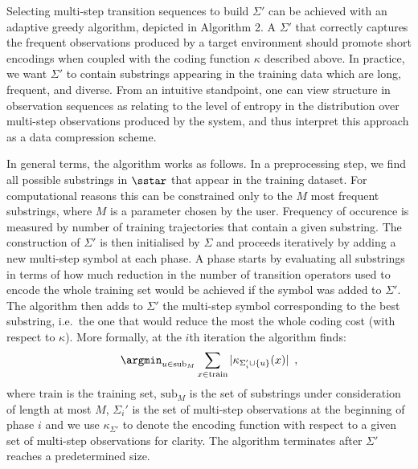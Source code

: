 Selecting multi-step transition sequences to build $\Sigma'$ can be achieved with an adaptive greedy algorithm, depicted in Algorithm 2. A $\Sigma'$ that correctly captures the frequent observations produced by a target environment should promote short encodings when coupled with the coding function $\kappa$ described above. In practice, we want $\Sigma'$ to contain substrings appearing in the training data which are long, frequent, and diverse. From an intuitive standpoint, one can view structure in observation sequences as relating to the level of entropy in the distribution over multi-step observations produced by the system, and thus interpret this approach as a data compression scheme. 

In general terms, the algorithm works as follows. In a preprocessing step, we find all possible substrings in $\sstar$ that appear in the training dataset. For computational reasons this can be constrained only to the $M$ most frequent substrings, where $M$ is a parameter chosen by the user. Frequency of occurence is measured by number of training trajectories that contain a given substring. The construction of $\Sigma'$ is then initialised by $\Sigma$ and proceeds iteratively by adding a new multi-step symbol at each phase. A phase starts by evaluating all substrings in terms of how much reduction in the number of transition operators used to encode the whole training set would be achieved if the symbol was added to $\Sigma'$. The algorithm then adds to $\Sigma'$ the multi-step symbol corresponding to the best substring, i.e.\ the one that would reduce the most the whole coding cost (with respect to $\kappa$). More formally, at the $i$th iteration the algorithm finds:
\begin{equation*}
\argmin_{u \in \mathrm{sub}_M} \sum_{x \in \mathrm{train}} |\kappa_{\Sigma_i' \cup \{u\}}(x)| \enspace,
\end{equation*}
where $\mathrm{train}$ is the training set, $\mathrm{sub}_M$ is the set of substrings under consideration of length at most $M$, $\Sigma_i'$ is the set of multi-step observations at the beginning of phase $i$ and we use $\kappa_{\Sigma'}$ to denote the encoding function with respect to a given set of multi-step observations for clarity. The algorithm terminates after $\Sigma'$ reaches a predetermined size.



